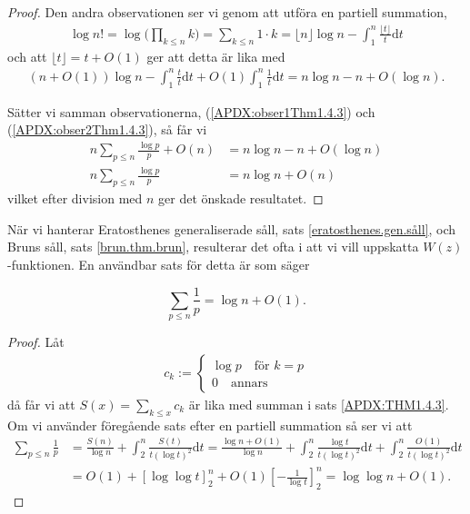 \begin{proof}
Den andra observationen ser vi genom att utföra en partiell summation,
\begin{align*}
    \log n! = \log \Big(\prod_{k \leq n} k\Big) = \sum_{k \leq n} 1 \cdot k = 
    \lfloor n \rfloor \log n - \int_1^n \frac{\lfloor t \rfloor}{t} \text{d} t 
\end{align*}
och att \(\lfloor t \rfloor = t + O(1)\) ger att detta är lika med
\begin{align} \label{APDX:obser2Thm1.4.3}
    (n + O(1)) \log n - \int_1^n \frac{t}{t} \text{d} t + O(1) \int_1^n \frac{1}{t} \text{d} t  = n \log n - n + O(\log n).
\end{align}

Sätter vi samman observationerna, (\ref{APDX:obser1Thm1.4.3}) och (\ref{APDX:obser2Thm1.4.3}), så får vi 
\begin{align*}
    n \sum_{p \leq n} \frac{\log p}{p} + O(n) &= n \log n - n + O(\log n) \\
    n \sum_{p \leq n} \frac{\log p}{p} &= n \log n + O(n)
\end{align*}
vilket efter division med $n$ ger det önskade resultatet.
\end{proof}

När vi hanterar Eratosthenes generaliserade såll, sats \ref{eratosthenes.gen.såll}, och Bruns såll, sats \ref{brun.thm.brun}, resulterar det ofta i att vi vill uppskatta \(W(z)\)-funktionen. En användbar sats för detta är \cite[Sats 1.4.4]{cojocarumurty} som säger
\begin{theorem} \label{APDX:THM1.4.4}
    \[\sum_{p \leq n} \frac{1}{p} = \log n + O(1).\]
\end{theorem}
\begin{proof}
Låt
\begin{align*}
    c_k := 
    \begin{cases}
    \log p \quad \text{för } k = p \\
    0 \quad \text{annars}
    \end{cases}
\end{align*}
då får vi att \(S(x) = \sum_{k \leq x} c_k\) är lika med summan i sats \ref{APDX:THM1.4.3}. Om vi använder föregående sats efter en partiell summation så ser vi att
\begin{align*}
    \sum_{p \leq n} \frac{1}{p} &= \frac{S(n)}{\log n} + \int_2^n \frac{S(t)}{t(\log t)^2} \text{d}t 
    = \frac{\log n + O(1)}{\log n} + \int_2^n \frac{\log t}{t(\log t)^2} \text{d}t + \int_2^n \frac{O(1)}{t(\log t)^2} \text{d}t \\
    &= O(1) + \left[\log \log t \right]_2^n + O(1) \left[- \frac{1}{\log t} \right]_2^n
    = \log \log n  + O(1).
\end{align*}

\end{proof}